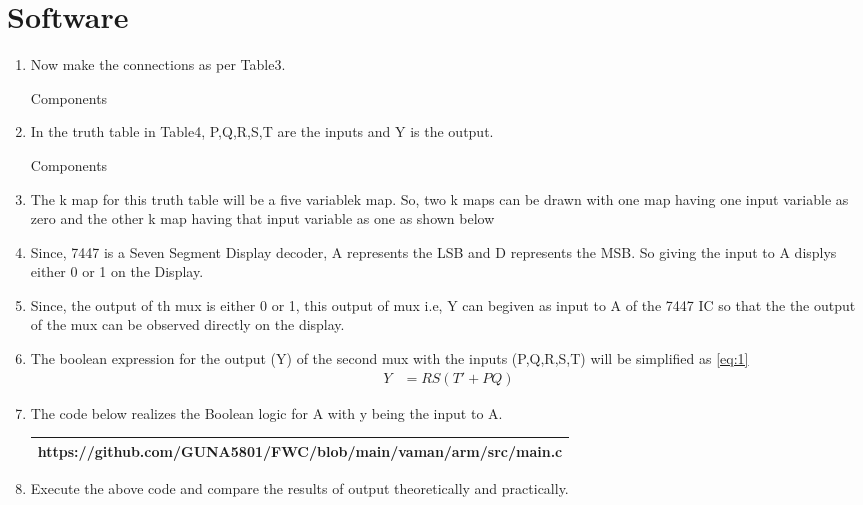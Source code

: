 \documentclass{article}
\begin{document}
\section{Software}
		\begin{enumerate}
			\item Now make the connections as per Table3.

\begin{table}[h]
\centering

\caption{Components}
\label{table:Components}
\end{table}
			
			\item In the truth table in Table4, P,Q,R,S,T are the inputs and Y is the output.

\begin{table}[h]
\centering

\caption{Components}
\label{table:Components}
\end{table}
	
			\item The k map for this truth table will be a five variablek map. So, two k maps can be drawn with one map having one input variable as zero and the other k map having that input variable as one as shown below

	\begin{karnaugh-map}[4][4][2][$T$][$S$][$R$][$Q$][$P$]   
	     \autoterms[0]   
             \end{karnaugh-map}			
				
		\item Since, 7447 is a Seven Segment Display decoder, A represents the LSB and D represents the MSB. So giving the input to A displys either 0 or 1 on the Display.
			\item Since, the output of th mux is either 0 or 1, this output of mux i.e, Y can begiven as input to A of the 7447 IC so that the the output of the mux can be observed directly on the display.
			\item The boolean expression for the output (Y) of the second mux with the inputs (P,Q,R,S,T) will be simplified as \ref{eq:1}
				\begin{align}
					{Y} &= {RS(T'+PQ)}
					\label{eq:1}
				\end{align}
				\item The code below realizes the Boolean logic for A with y being the input to A.\\
	
\begin{tabularx}{1\textwidth} { 
  | >{\centering\arraybackslash}X |}
  \hline
      https://github.com/GUNA5801/FWC/blob/main/vaman/arm/src/main.c\\
  \hline
\end{tabularx}



	\item Execute the above code and compare the results of output theoretically and practically.
	\end{enumerate}
\end{document}
